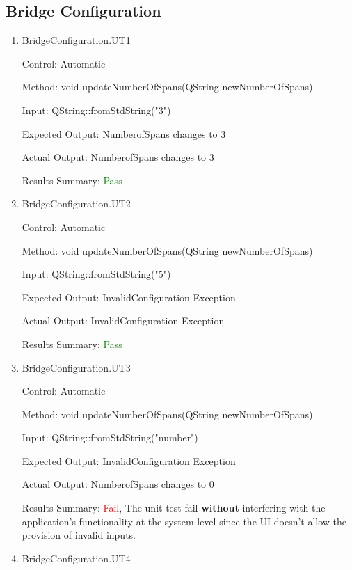 \documentclass[12pt, titlepage]{article}
\begin{document}
\subsection{Bridge Configuration}
\begin{enumerate}
    \item{BridgeConfiguration.UT1\\}
    
    Control: Automatic
    
    Method:  void updateNumberOfSpans(QString newNumberOfSpans)
    
    Input: QString::fromStdString("3")
    
    Expected Output: NumberofSpans changes to 3

    Actual Output: NumberofSpans changes to 3

    Results Summary: \textcolor{green} {Pass}

    \item{BridgeConfiguration.UT2\\}
    
    Control: Automatic
    
    Method:  void updateNumberOfSpans(QString newNumberOfSpans)
    
    Input: QString::fromStdString("5")
    
    Expected Output: InvalidConfiguration Exception

    Actual Output: InvalidConfiguration Exception

    Results Summary: \textcolor{green} {Pass}

    \item {BridgeConfiguration.UT3\\}
    
    Control: Automatic
    
    Method:  void updateNumberOfSpans(QString newNumberOfSpans)
    
    Input: QString::fromStdString("number")
    
    Expected Output: InvalidConfiguration Exception

    Actual Output: NumberofSpans changes to 0

    Results Summary: \textcolor{red} {Fail}, The unit test fail
\textbf{without} interfering with the application’s functionality at the system level
since the UI doesn’t allow the provision of invalid inputs.
    
    \item {BridgeConfiguration.UT4\\}
    

\end{enumerate}
\end{document}
